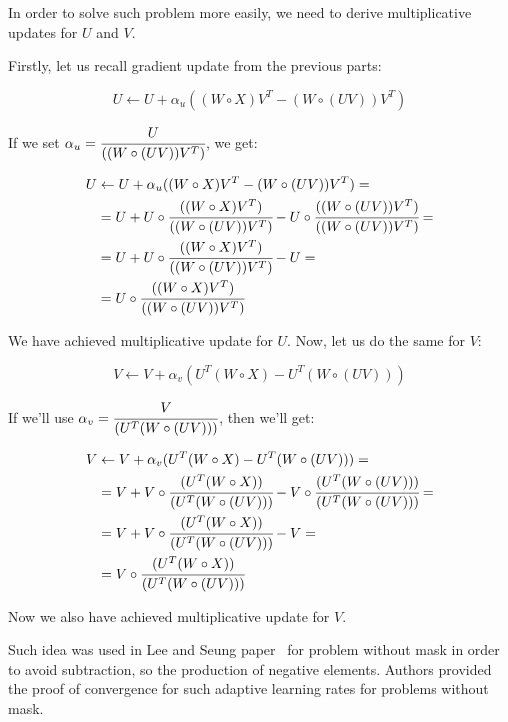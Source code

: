 \documentclass{article}
\begin{document}
In order to solve such problem more easily, we need to derive multiplicative updates for $U$ and $V$.

Firstly, let us recall gradient update from the previous parts:

\begin{equation}
  U \gets U + \alpha_u ((W \circ X) V^T - (W \circ (UV)) V^T)
\end{equation}

If we set $\alpha_u = \cfrac{U}{((W \circ (UV)) V^T)}$, we get:

\begin{equation}
  \begin{aligned}
    U & \gets U + \alpha_u ((W \circ X) V^T - (W \circ (UV)) V^T) = \\ & = U + U \circ \cfrac{((W \circ X) V^T)}{((W \circ (UV)) V^T)} - U \circ \cfrac{((W \circ (UV)) V^T)}{((W \circ (UV)) V^T)} = \\ & = U + U \circ \cfrac{((W \circ X) V^T)}{((W \circ (UV)) V^T)} - U =\\ & = U \circ \cfrac{((W \circ X) V^T)}{((W \circ (UV)) V^T)}
  \end{aligned}
\end{equation}

We have achieved multiplicative update for $U$. Now, let us do the same for $V$:

\begin{equation}
  V \gets V + \alpha_v (U^T (W \circ X) - U^T (W \circ (UV)))
\end{equation}

If we'll use $\alpha_v = \cfrac{V}{(U^T (W \circ (UV)))}$, then we'll get:

\begin{equation}
  \begin{aligned}
    V & \gets V + \alpha_v (U^T (W \circ X) - U^T (W \circ (UV))) = \\ & = V + V \circ \cfrac{(U^T (W \circ X))}{(U^T (W \circ (UV)))} - V \circ \cfrac{(U^T (W \circ (UV)))}{(U^T (W \circ (UV)))} = \\ & = V + V \circ \cfrac{(U^T (W \circ X))}{(U^T (W \circ (UV)))} - V = \\ & = V \circ \cfrac{(U^T (W \circ X))}{(U^T (W \circ (UV)))}
  \end{aligned}
\end{equation}

Now we also have achieved multiplicative update for $V$.

Such idea was used in Lee and Seung paper~\cite{lee} for problem without mask in order to avoid subtraction, so the production of negative elements. Authors provided the proof of convergence for such adaptive learning rates for problems without mask.
\end{document}
